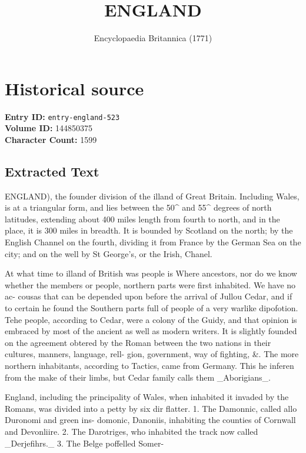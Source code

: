 \documentclass{article}
\title{ENGLAND}
\date{Encyclopaedia Britannica (1771)}
\begin{document}
\maketitle

\section*{Historical source}
\textbf{Entry ID:} \texttt{entry-england-523} \\
\textbf{Volume ID:} 144850375 \\
\textbf{Character Count:} 1599

\subsection*{Extracted Text}
ENGLAND), the founder division of the illand of Great Britain. Including Wales, is at a triangular form, and lies between the 50\textasciicircum{} and 55\textasciicircum{} degrees of north latitudes, extending about 400 miles length from fourth to north, and in the place, it is 300 miles in breadth. It is bounded by Scotland on the north; by the English Channel on the fourth, dividing it from France by the German Sea on the city; and on the well by St George's, or the Irish, Chanel.

At what time to illand of British was people is Where ancestors, nor do we know whether the members or people, northern parts were first inhabited. We have no ac- cousas that can be depended upon before the arrival of Jullou Cedar, and if to certain he found the Southern parts full of people of a very warlike dipofotion. Tehe people, according to Cedar, were a colony of the Guidy, and that opinion is embraced by most of the ancient as well as modern writers. It is slightly founded on the agreement obtered by the Roman between the two nations in their cultures, manners, language, rell- gion, government, way of fighting, \&. The more northern inhabitants, according to Tactics, came from Germany. This he inferen from the make of their limbs, but Cedar family calls them \_Aborigians\_.

England, including the principality of Wales, when inhabited it invaded by the Romans, was divided into a petty by six dir flatter. 1. The Damonnic, called allo Duronomi and green ins- domonic, Danoniis, inhabiting the counties of Cornwall and Devonliire. 2. The Darotriges, who inhabited the track now called \_Derjefihrs.\_ 3. The Belge poffelled Somer-
\end{document}
